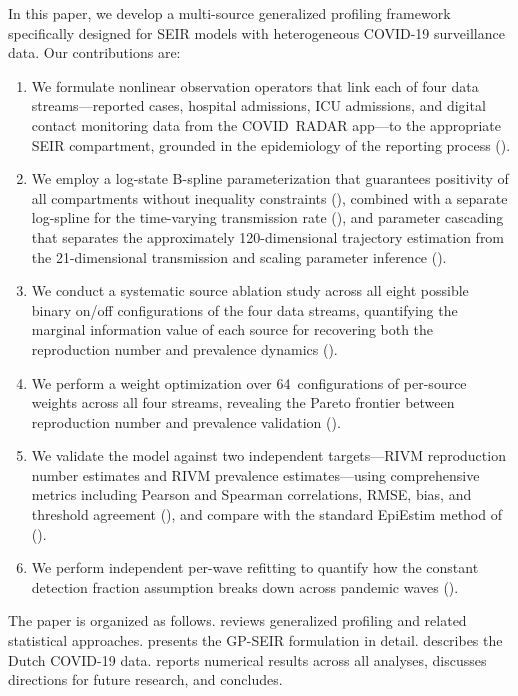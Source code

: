 \documentclass[11pt]{article}
\begin{document}
In this paper, we develop a multi-source generalized profiling framework specifically designed for SEIR models with heterogeneous COVID-19 surveillance data. Our contributions are:
\begin{enumerate}
  \item We formulate nonlinear observation operators that link each of four data streams---reported cases, hospital admissions, ICU admissions, and digital contact monitoring data from the COVID~RADAR app---to the appropriate SEIR compartment, grounded in the epidemiology of the reporting process ().
  \item We employ a log-state B-spline parameterization that guarantees positivity of all compartments without inequality constraints (), combined with a separate log-spline for the time-varying transmission rate (), and parameter cascading that separates the approximately 120-dimensional trajectory estimation from the 21-dimensional transmission and scaling parameter inference ().
  \item We conduct a systematic source ablation study across all eight possible binary on/off configurations of the four data streams, quantifying the marginal information value of each source for recovering both the reproduction number and prevalence dynamics ().
  \item We perform a weight optimization over 64~configurations of per-source weights across all four streams, revealing the Pareto frontier between reproduction number and prevalence validation ().
  \item We validate the model against two independent targets---RIVM reproduction number estimates and RIVM prevalence estimates---using comprehensive metrics including Pearson and Spearman correlations, RMSE, bias, and threshold agreement (), and compare with the standard EpiEstim method of \citet{Cori2013} ().
  \item We perform independent per-wave refitting to quantify how the constant detection fraction assumption breaks down across pandemic waves ().
\end{enumerate}

The paper is organized as follows.  reviews generalized profiling and related statistical approaches.  presents the GP-SEIR formulation in detail.  describes the Dutch COVID-19 data.  reports numerical results across all analyses,  discusses directions for future research, and  concludes.
\end{document}
